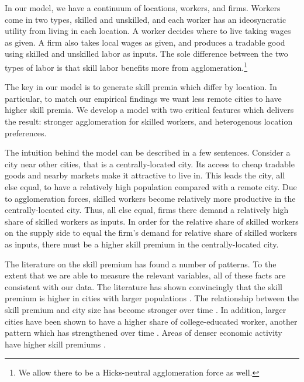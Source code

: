 \documentclass[12 pt]{article}
\begin{document}
In our model, we have a continuum of locations, workers, and firms.  Workers come in two types, skilled and unskilled, and each worker has an ideosyncratic utility from living in each location.  A worker decides where to live taking wages as given.  A firm also takes local wages as given, and produces a tradable good using skilled and unskilled labor as inputs.  The sole difference between the two types of labor is that skill labor benefits more from agglomeration.\footnote{We allow there to be a Hicks-neutral agglomeration force as well.}

The key in our model is to generate skill premia which differ by location.  In particular, to match our empirical findings we want less remote cities to have higher skill premia.  We develop a model with two critical features which delivers the result: stronger agglomeration for skilled workers, and heterogenous location preferences. 

The intuition behind the model can be described in a few sentences.  Consider a city near other cities, that is a centrally-located city.  Its access to cheap tradable goods and nearby markets make it attractive to live in.  This leads the city, all else equal, to have a relatively high population compared with a remote city.  Due to agglomeration forces, skilled workers become relatively more productive in the centrally-located city.  Thus, all else equal, firms there demand a relatively high share of skilled workers as inputs.  In order for the relative share of skilled workers on the supply side to equal the firm's demand for relative share of skilled workers as inputs, there must be a higher skill premium in the centrally-located city.

The literature on the skill premium has found a number of patterns.  To the extent that we are able to measure the relevant variables, all of these facts are consistent with our data.  The literature has shown convincingly that the skill premium is higher in cities with larger populations \citep{davis2012spatial}.  The relationship between the skill premium and city size has become stronger over time \citep{baum2013inequality, lindley2014spatial}.  In addition, larger cities have been shown to have a higher share of college-educated worker, another pattern which has strengthened over time \citep{moretti2008real, lindley2014spatial}.  Areas of denser economic activity have higher skill premiums \citep{combes2012sorting}.
\end{document}
